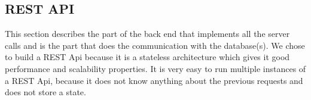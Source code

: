 \subsection{REST API}
\label{ssec:2:restapi}
This section describes the part of the back end that implements all the server calls and is the part that does the communication with the database(s). We chose to build a REST Api because it is a stateless architecture which gives it good performance and scalability properties. It is very easy to run multiple instances of a REST Api, because it does not know anything about the previous requests and does not store a state.

